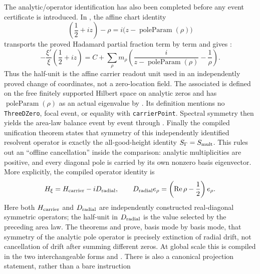 \documentclass[11pt]{article}
\theoremstyle{definition}
\renewcommand{\Re}{\operatorname{Re}}
\begin{document}
The analytic/operator identification has also been completed before any event
certificate is introduced.  In
, the affine chart identity
\[
  \left(\frac12+iz\right)-\rho
     =i\bigl(z-\operatorname{poleParam}(\rho)\bigr)
\]
transports the proved Hadamard partial fraction term by term and gives
:
\[
 -\frac{\xi'}{\xi}\!\left(\frac12+iz\right)
 = C+\sum_{\rho}m_\rho\left(
      \frac{i}{z-\operatorname{poleParam}(\rho)}-\frac1\rho\right).
\]
Thus the half-unit is the affine carrier readout unit used in an independently
proved change of coordinates, not a zero-location field.  The associated
 is defined on the free finitely supported Hilbert
space on analytic zeros and has
\(\operatorname{poleParam}(\rho)\) as an actual eigenvalue by
.  Its definition mentions no
\texttt{ThreeDZero}, focal event, or equality with \texttt{carrierPoint}.
Spectral symmetry then yields the area-law balance event by event through
.  Finally the compiled
unification theorem
states that symmetry of this independently identified resolvent operator is
exactly the all-good-height identity \(S_\Gamma=S_{\rm mult}\).  This rules out
an ``offline cancellation'' inside the comparison: analytic multiplicities are
positive, and every diagonal pole is carried by its own nonzero basis
eigenvector.
More explicitly, the compiled operator identity
 is
\[
 H_{\xi}=H_{\rm carrier}-iD_{\rm radial},\qquad
 D_{\rm radial}e_\rho=
   \left(\Re\rho-\frac12\right)e_\rho .
\]
Here both \(H_{\rm carrier}\) and \(D_{\rm radial}\) are independently
constructed real-diagonal symmetric operators; the half-unit in
\(D_{\rm radial}\) is the value selected by the preceding area law.  The
theorems
 and
 prove,
basis mode by basis mode, that symmetry of the analytic pole operator is
precisely extinction of radial drift, not cancellation of drift after summing
different zeros.  At global scale this is compiled in the two interchangeable
forms
 and
.
There is also a canonical projection statement, rather than a bare instruction
\end{document}
